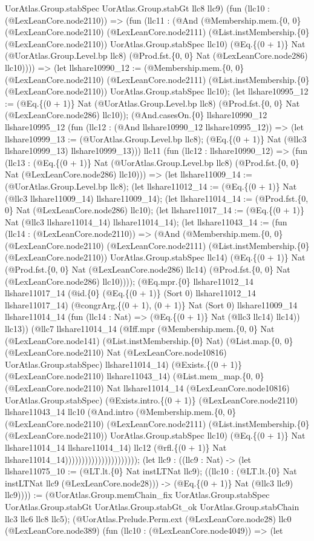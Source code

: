 \documentclass[11pt]{article}
\begin{document}
UorAtlas.Group.stabSpec UorAtlas.Group.stabGt llc8 llc9) (fun (llc10 : (@LexLeanCore.node2110)) => (fun (llc11 : (@And (@Membership.mem.\{0, 0\} (@LexLeanCore.node2110) (@LexLeanCore.node2111) (@List.instMembership.\{0\} (@LexLeanCore.node2110)) UorAtlas.Group.stabSpec llc10) (@Eq.\{(0 + 1)\} Nat (@UorAtlas.Group.Level.bp llc8) (@Prod.fst.\{0, 0\} Nat (@LexLeanCore.node286) llc10)))) => (let llshare10990\_12 := (@Membership.mem.\{0, 0\} (@LexLeanCore.node2110) (@LexLeanCore.node2111) (@List.instMembership.\{0\} (@LexLeanCore.node2110)) UorAtlas.Group.stabSpec llc10); (let llshare10995\_12 := (@Eq.\{(0 + 1)\} Nat (@UorAtlas.Group.Level.bp llc8) (@Prod.fst.\{0, 0\} Nat (@LexLeanCore.node286) llc10)); (@And.casesOn.\{0\} llshare10990\_12 llshare10995\_12 (fun (llc12 : (@And llshare10990\_12 llshare10995\_12)) => (let llshare10999\_13 := (@UorAtlas.Group.Level.bp llc8); (@Eq.\{(0 + 1)\} Nat (@llc3 llshare10999\_13) llshare10999\_13))) llc11 (fun (llc12 : llshare10990\_12) => (fun (llc13 : (@Eq.\{(0 + 1)\} Nat (@UorAtlas.Group.Level.bp llc8) (@Prod.fst.\{0, 0\} Nat (@LexLeanCore.node286) llc10))) => (let llshare11009\_14 := (@UorAtlas.Group.Level.bp llc8); (let llshare11012\_14 := (@Eq.\{(0 + 1)\} Nat (@llc3 llshare11009\_14) llshare11009\_14); (let llshare11014\_14 := (@Prod.fst.\{0, 0\} Nat (@LexLeanCore.node286) llc10); (let llshare11017\_14 := (@Eq.\{(0 + 1)\} Nat (@llc3 llshare11014\_14) llshare11014\_14); (let llshare11043\_14 := (fun (llc14 : (@LexLeanCore.node2110)) => (@And (@Membership.mem.\{0, 0\} (@LexLeanCore.node2110) (@LexLeanCore.node2111) (@List.instMembership.\{0\} (@LexLeanCore.node2110)) UorAtlas.Group.stabSpec llc14) (@Eq.\{(0 + 1)\} Nat (@Prod.fst.\{0, 0\} Nat (@LexLeanCore.node286) llc14) (@Prod.fst.\{0, 0\} Nat (@LexLeanCore.node286) llc10)))); (@Eq.mpr.\{0\} llshare11012\_14 llshare11017\_14 (@id.\{0\} (@Eq.\{(0 + 1)\} (Sort 0) llshare11012\_14 llshare11017\_14) (@congrArg.\{(0 + 1), (0 + 1)\} Nat (Sort 0) llshare11009\_14 llshare11014\_14 (fun (llc14 : Nat) => (@Eq.\{(0 + 1)\} Nat (@llc3 llc14) llc14)) llc13)) (@llc7 llshare11014\_14 (@Iff.mpr (@Membership.mem.\{0, 0\} Nat (@LexLeanCore.node141) (@List.instMembership.\{0\} Nat) (@List.map.\{0, 0\} (@LexLeanCore.node2110) Nat (@LexLeanCore.node10816) UorAtlas.Group.stabSpec) llshare11014\_14) (@Exists.\{(0 + 1)\} (@LexLeanCore.node2110) llshare11043\_14) (@List.mem\_map.\{0, 0\} (@LexLeanCore.node2110) Nat llshare11014\_14 (@LexLeanCore.node10816) UorAtlas.Group.stabSpec) (@Exists.intro.\{(0 + 1)\} (@LexLeanCore.node2110) llshare11043\_14 llc10 (@And.intro (@Membership.mem.\{0, 0\} (@LexLeanCore.node2110) (@LexLeanCore.node2111) (@List.instMembership.\{0\} (@LexLeanCore.node2110)) UorAtlas.Group.stabSpec llc10) (@Eq.\{(0 + 1)\} Nat llshare11014\_14 llshare11014\_14) llc12 (@rfl.\{(0 + 1)\} Nat llshare11014\_14)))))))))))))))))))))); (let llc9 : ((llc9 : Nat) -> (let llshare11075\_10 := (@LT.lt.\{0\} Nat instLTNat llc9); ((llc10 : (@LT.lt.\{0\} Nat instLTNat llc9 (@LexLeanCore.node28))) -> (@Eq.\{(0 + 1)\} Nat (@llc3 llc9) llc9)))) := (@UorAtlas.Group.memChain\_fix UorAtlas.Group.stabSpec UorAtlas.Group.stabGt UorAtlas.Group.stabGt\_ok UorAtlas.Group.stabChain llc3 llc6 llc8 llc5); (@UorAtlas.Prelude.Perm.ext (@LexLeanCore.node28) llc0 (@LexLeanCore.node389) (fun (llc10 : (@LexLeanCore.node4049)) => (let 
\end{document}
